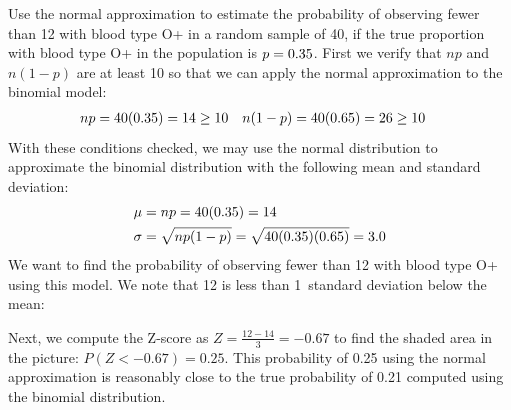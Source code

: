 \begin{examplewrap}
\begin{nexample}{Use the normal approximation to estimate the probability of observing fewer than 12 with blood type O+ in a random sample of 40, if the true proportion with blood type O+ in the population is $p=0.35{}$.}
\label{approxBinomialForN40P35OPosExample}%
First we verify that $np$ and $n(1-p)$ are at least 10 so that we can apply the normal approximation to the binomial model:
\begin{align*}
np& = 40(0.35{})=14\ge 10
&
n(1-p)& = 40(0.65{}) = 26\ge 10
\end{align*}
With these conditions checked, we may use the normal distribution to approximate the binomial distribution with the following mean and standard deviation:
\begin{align*}
\mu &= np = 40(0.35{})=14\\
\sigma &= \sqrt{np(1-p)} = \sqrt{40(0.35{})(0.65{})} = 3.0
\end{align*}
We want to find the probability of observing fewer than 12 with blood type O+ using this model. We note that 12 is less than 1~standard deviation below the mean:
\begin{center}
\end{center}
Next, we compute the Z-score as $Z=\frac{12 - 14}{3} = -0.67$ to find the shaded area in the picture: $P(Z < -0.67) = 0.25$. This probability of 0.25 using the normal approximation is reasonably close to the true probability of 0.21 computed using the binomial distribution.
\end{nexample}
\end{examplewrap}



